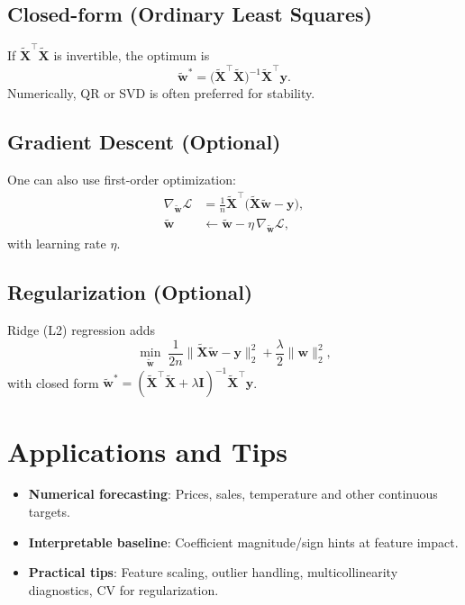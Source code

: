 \documentclass{article}
\begin{document}
\subsection{Closed-form (Ordinary Least Squares)}
If \(\tilde{\mathbf{X}}^\top\tilde{\mathbf{X}}\) is invertible, the optimum is
\begin{equation}
    \tilde{\mathbf{w}}^* = \big(\tilde{\mathbf{X}}^\top\tilde{\mathbf{X}}\big)^{-1}\tilde{\mathbf{X}}^\top\mathbf{y}.
\end{equation}
Numerically, QR or SVD is often preferred for stability.

\subsection{Gradient Descent (Optional)}
One can also use first-order optimization:
\begin{align}
    \nabla_{\tilde{\mathbf{w}}} \mathcal{L} &= \frac{1}{n} \tilde{\mathbf{X}}^\top\big(\tilde{\mathbf{X}}\tilde{\mathbf{w}} - \mathbf{y}\big),\\
    \tilde{\mathbf{w}} &\leftarrow \tilde{\mathbf{w}} - \eta\, \nabla_{\tilde{\mathbf{w}}} \mathcal{L},
\end{align}
with learning rate \(\eta\).

\subsection{Regularization (Optional)}
Ridge (L2) regression adds
\begin{equation}
    \min_{\tilde{\mathbf{w}}}\; \frac{1}{2n}\lVert \tilde{\mathbf{X}}\tilde{\mathbf{w}}-\mathbf{y}\rVert_2^2 + \frac{\lambda}{2}\lVert \mathbf{w}\rVert_2^2,
\end{equation}
with closed form \(\tilde{\mathbf{w}}^* = (\tilde{\mathbf{X}}^\top\tilde{\mathbf{X}} + \lambda\mathbf{I})^{-1}\tilde{\mathbf{X}}^\top\mathbf{y}\).

\section{Applications and Tips}
\begin{itemize}
  \item \textbf{Numerical forecasting}: Prices, sales, temperature and other continuous targets.
  \item \textbf{Interpretable baseline}: Coefficient magnitude/sign hints at feature impact.
  \item \textbf{Practical tips}: Feature scaling, outlier handling, multicollinearity diagnostics, CV for regularization.
\end{itemize}
\end{document}
